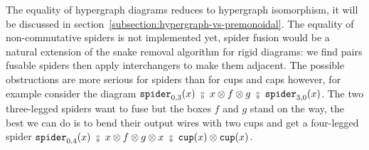 The equality of hypergraph diagrams reduces to hypergraph isomorphism, it will be discussed in section~\ref{subsection:hypergraph-vs-premonoidal}.
The equality of non-commutative spiders is not implemented yet, spider fusion would be a natural extension of the snake removal algorithm for rigid diagrams: we find pairs fusable spiders then apply interchangers to make them adjacent.
The possible obstructions are more serious for spiders than for cups and caps however, for example consider the diagram $\spider_{0, 3}(x) \ \fcmp \ x \otimes f \otimes g \ \fcmp \ \spider_{3, 0}(x)$.
The two three-legged spiders want to fuse but the boxes $f$ and $g$ stand on the way, the best we can do is to bend their output wires with two cups and get a four-legged spider $\spider_{0, 4}(x) \ \fcmp \ x \otimes f \otimes g \otimes x \ \fcmp \ \ttcup(x) \otimes \ttcup(x)$.

